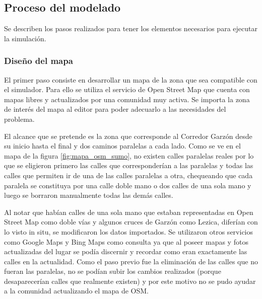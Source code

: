 \subsection{Proceso del modelado}

Se describen los pasos realizados para tener los elementos necesarios para ejecutar la simulación.

\subsubsection{Diseño del mapa}

El primer paso consiste en desarrollar un mapa de la zona que sea compatible con el simulador. Para ello se utiliza el servicio de Open Street Map \citep{OSM} que cuenta con mapas libres y actualizados por una comunidad muy activa. Se importa la zona de interés del mapa al editor \citet{JOSM} para poder adecuarlo a las necesidades del problema. 

El alcance que se pretende es la zona que corresponde al Corredor Garzón desde su inicio hasta el final y dos caminos paralelas a cada lado.
Como se ve en el mapa de la figura \ref{fig:mapa_osm_sumo}, no existen calles paralelas reales por lo que se eligieron primero las calles que corresponderían a las paralelas y todas las calles que permiten ir de una de las calles paralelas a otra, chequeando que cada paralela se constituya por una calle doble mano o dos calles de una sola mano y luego se borraron manualmente todas las demás calles.

Al notar que habían calles de una sola mano que estaban representadas en Open Street Map como doble vías y algunos cruces de Garzón como Lezica, diferían con lo visto in situ, se modificaron los datos importados. Se utilizaron otros servicios como Google Maps y Bing Maps como consulta ya que al poseer mapas y fotos actualizadas del lugar se podía discernir y recordar como eran exactamente las calles en la actualidad. Como el paso previo fue la eliminación de las calles que no fueran las paralelas, no se podían subir los cambios realizados (porque desaparecerían calles que realmente existen) y por este motivo no se pudo ayudar a la comunidad actualizando el mapa de OSM.

